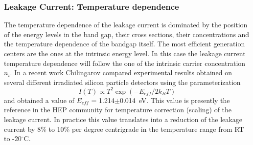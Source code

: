 \subsubsection*{Leakage Current: Temperature dependence}
The temperature dependence of the leakage current is dominated by the position of the energy levels in the band gap, their cross sections, their concentrations and the temperature dependence of the bandgap itself. 
The most efficient generation centers are the ones at the intrinsic energy level. In this case the  leakage current 
temperature dependence will follow the one of the intrinsic carrier concentration $n_i$. In a recent 
	work Chilingarov \cite{2013-Chilingarov-Tscaling} compared experimental results obtained on several different irradiated silicon particle detectors using the parameterization 
\begin{equation}
I(T) \propto T^2 \exp \left( - E_{eff}/2k_B T\right)
\end{equation}
and obtained a value of $E_{eff}$ = 1.214$\pm$0.014~eV. This value is presently the reference in the HEP 
community for temperature correction (scaling) of the leakage current. In practice this value translates into a reduction of the leakage current by  8\% to 10\% per degree centrigrade in the temperature range from RT to -20$^\circ$C.
